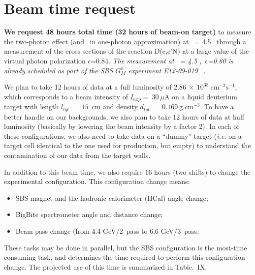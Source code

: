 \section{Beam time request}

{\bf We request 48 hours total time (32 hours of beam-on target)} to measure the two-photon effect (and \gen~in one-photon approximation) 
at \qsq~= 4.5 \gevcsq~through a measurement of the cross sections of the reaction D(e,e'N) at a large value of the virtual photon polarization $\epsilon$=0.84.
{\em The measurement at \qsq~= 4.5 \gevcsq,~$\epsilon$=0.60 is already scheduled as part of the SBS $G_M^n$ experiment E12-09-019}~ \cite{E12-09-019}.

We plan to take 12 hours of data at a full luminosity of $2.86~\times~10^{38}~\mathrm{cm}^{-2}\mathrm{s}^{-1}$, which corresponds to a beam intensity of $I_{exp} =~30~\mu$A on a liquid deuterium target with length $l_{tgt}~=~15$~cm and density $d_{tgt}~=~0.169~\mathrm{g.cm}^{-3}$. 
To have a better handle on our backgrounds, we also plan to take 12 hours of data at half luminosity (basically by lowering the beam intensity by a factor 2).
In each of these configurations, we also need to take data on a ``dummy'' target ({\it i.e.} on a target cell identical to the one used for production, but empty) to understand the contamination of our data from the target walls.

In addition to this beam time, we also require 16 hours (two shifts) to change the experimental configuration.
This configuration change means:
%
\begin{itemize}
\item{SBS magnet and the hadronic calorimeter (HCal) angle change;}
\item{BigBite spectrometer angle and distance change;}
\item{Beam pass change (from 4.4 GeV/2~pass to 6.6 GeV/3~pass;}
\end{itemize}
%
These tasks may be done in parallel, but the SBS configuration is the most-time consuming task, and determines the time required to perform this configuration change. The projected use of this time is summarized in Table.~IX.%

